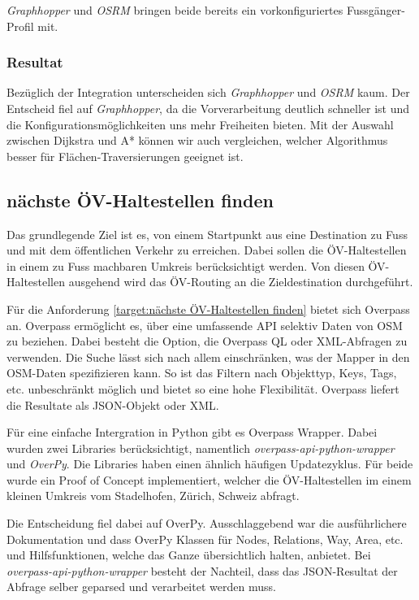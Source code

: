 \emph{Graphhopper} und \emph{OSRM} bringen beide bereits ein vorkonfiguriertes Fussgänger-Profil mit.

\subsubsection{Resultat}
\label{analyse:Resulat}
Bezüglich der Integration unterscheiden sich \emph{Graphhopper} und \emph{OSRM} kaum. Der Entscheid fiel auf \emph{Graphhopper}, da die Vorverarbeitung deutlich schneller ist und die Konfigurationsmöglichkeiten uns mehr Freiheiten bieten. Mit der Auswahl zwischen Dijkstra \cite{dijkstra_algorithm} und A* \cite{astar} können wir auch vergleichen, welcher Algorithmus besser für Flächen-Traversierungen geeignet ist.


\subsection{nächste ÖV-Haltestellen finden}
\label{analyse:nächste ÖV-Haltestellen finden}

Das grundlegende Ziel ist es, von einem Startpunkt aus eine Destination zu Fuss und mit dem öffentlichen Verkehr zu erreichen. Dabei sollen die ÖV-Haltestellen in einem zu Fuss machbaren Umkreis berücksichtigt werden. Von diesen ÖV-Haltestellen ausgehend wird das ÖV-Routing an die Zieldestination durchgeführt.

Für die Anforderung \ref{target:nächste ÖV-Haltestellen finden} bietet sich Overpass an. Overpass ermöglicht es, über eine umfassende \ac{API} selektiv Daten von \ac{OSM} zu beziehen. Dabei besteht die Option, die Overpass \ac{QL} oder XML-Abfragen zu verwenden. Die Suche lässt sich nach allem einschränken, was der Mapper in den \ac{OSM}-Daten spezifizieren kann. So ist das Filtern nach Objekttyp, Keys, Tags, etc. unbeschränkt möglich und bietet so eine hohe Flexibilität. Overpass liefert die Resultate als JSON-Objekt oder XML. 

Für eine einfache Intergration in Python gibt es Overpass Wrapper. Dabei wurden zwei Libraries berücksichtigt, namentlich \emph{overpass-api-python-wrapper} und \emph{OverPy}. Die Libraries haben einen ähnlich häufigen Updatezyklus. Für beide wurde ein Proof of Concept implementiert, welcher die ÖV-Haltestellen im einem kleinen Umkreis vom Stadelhofen, Zürich, Schweiz abfragt.

Die Entscheidung fiel dabei auf OverPy. Ausschlaggebend war die ausführlichere Dokumentation und dass OverPy Klassen für Nodes, Relations, Way, Area, etc. und Hilfsfunktionen, welche das Ganze übersichtlich halten, anbietet. Bei \emph{overpass-api-python-wrapper} besteht der Nachteil, dass das JSON-Resultat der Abfrage selber geparsed und verarbeitet werden muss.

